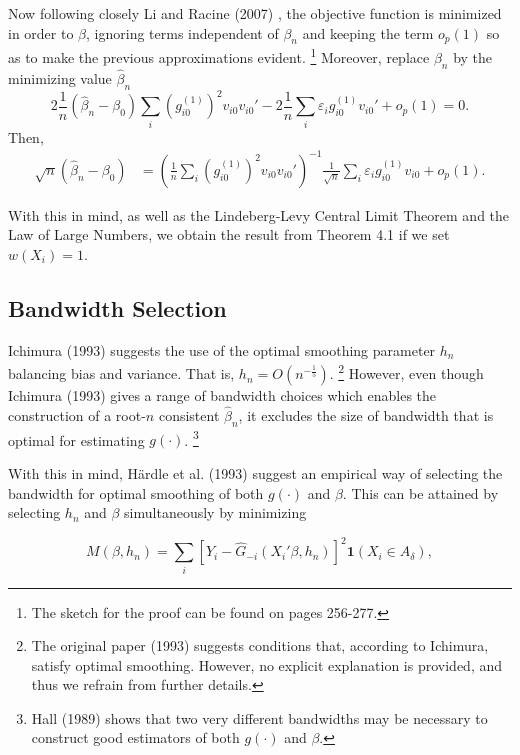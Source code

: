 \documentclass[a4paper]{article}
\begin{document}
Now following closely Li and Racine (2007) \cite{[1]}, the objective function is minimized in order to $\beta$, ignoring terms independent of $\beta_n$ and keeping the term $o_p(1)$ so as to make the previous approximations evident. \footnote{ The sketch for the proof can be found on pages 256-277.} Moreover, replace $\beta_n$ by the minimizing value $\hat{\beta}_n$
\[2\frac{1}{n}(\hat{\beta}_n - \beta_0)\sum_i(g_{i0}^{(1)})^2v_{i0}v_{i0}' - 2\frac{1}{n}\sum_i\varepsilon_ig_{i0}^{(1)}v_{i0}' + o_p(1) = 0.  \]
Then, 
\begin{align*}
\sqrt{n}(\hat{\beta}_n - \beta_0) & = (\frac{1}{n}\sum_i(g_{i0}^{(1)})^2v_{i0}v_{i0}')^{-1}\frac{1}{\sqrt{n}}\sum_i\varepsilon_i g_{i0}^{(1)}v_{i0} + o_p(1).
\end{align*}

With this in mind, as well as the Lindeberg-Levy Central Limit Theorem and the Law of Large Numbers, we obtain the result from Theorem 4.1 if we set $w(X_i) = 1$.




\subsection{Bandwidth Selection} %
\label{sub:Bandwidth Selection}

Ichimura (1993) \cite{[6]} suggests the use of the optimal smoothing parameter $h_n$ balancing bias and variance. That is, $h_n = O(n^{-\frac{1}{5}})$. \footnote{The original paper (1993) \cite{[6]} suggests conditions that, according to Ichimura, satisfy optimal smoothing. However, no explicit explanation is provided, and thus we refrain from further details.} However, even though Ichimura (1993) \cite{[6]} gives a range of bandwidth choices which enables the construction of a root-$n$ consistent $\hat{\beta}_n$, it excludes the size of bandwidth that is optimal for estimating $g(\cdot)$. \footnote{Hall (1989) \cite{[17]} shows that two very different bandwidths may be necessary to construct good estimators of both $g(\cdot)$ and $\beta$.}
 
With this in mind, H{\"a}rdle et al. (1993) \cite{[18]} suggest an empirical way of selecting the bandwidth for optimal smoothing of both $g(\cdot)$ and $\beta$. This can be attained by selecting $h_n$ and $\beta$ simultaneously by minimizing

\begin{equation}
M(\beta, h_n) = \sum_i \left[ Y_i - \hat{G}_{-i}(X_i'\beta, h_n) \right]^2\mathbf{1}{(X_i \in A_\delta)},
\end{equation}
\end{document}
